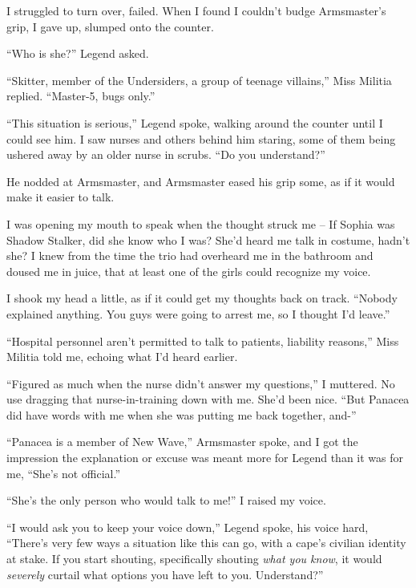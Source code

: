 I struggled to turn over, failed.  When I found I couldn't budge Armsmaster's grip, I gave up, slumped onto the counter.



``Who is she?'' Legend asked.



``Skitter, member of the Undersiders, a group of teenage villains,'' Miss Militia replied.  ``Master-5, bugs only.''



``This situation is serious,'' Legend spoke, walking around the counter until I could see him.  I saw nurses and others behind him staring, some of them being ushered away by an older nurse in scrubs.  ``Do you understand?''



He nodded at Armsmaster, and Armsmaster eased his grip some, as if it would make it easier to talk.



I was opening my mouth to speak when the thought struck me – If Sophia was Shadow Stalker, did she know who I was?  She'd heard me talk in costume, hadn't she?  I knew from the time the trio had overheard me in the bathroom and doused me in juice, that at least one of the girls could recognize my voice.



I shook my head a little, as if it could get my thoughts back on track.  ``Nobody explained anything.  You guys were going to arrest me, so I thought I'd leave.''



``Hospital personnel aren't permitted to talk to patients, liability reasons,'' Miss Militia told me, echoing what I'd heard earlier.



``Figured as much when the nurse didn't answer my questions,'' I muttered.  No use dragging that nurse-in-training down with me.  She'd been nice.  ``But Panacea did have words with me when she was putting me back together, and-''



``Panacea is a member of New Wave,'' Armsmaster spoke, and I got the impression the explanation or excuse was meant more for Legend than it was for me, ``She's not official.''



``She's the only person who would talk to me!'' I raised my voice.



``I would ask you to keep your voice down,'' Legend spoke, his voice hard, ``There's very few ways a situation like this can go, with a cape's civilian identity at stake.  If you start shouting, specifically shouting \emph{what you know}, it would \emph{severely} curtail what options you have left to you.  Understand?''




